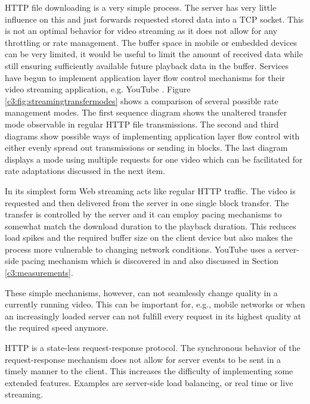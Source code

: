 \gls{HTTP} file downloading is a very simple process. The server has very little influence on this and just forwards requested stored data into a TCP socket. This is not an optimal behavior for video streaming as it does not allow for any throttling or rate management. The buffer space in mobile or embedded devices can be very limited, it would be useful to limit the amount of received data while still ensuring sufficiently available future playback data in the buffer. Services have begun to implement application layer flow control mechanisms for their video streaming application, e.g. YouTube \cite{alcock2011afcyt}. Figure \ref{c3:fig:streamingtransfermodes} shows a comparison of several possible rate management modes. The first sequence diagram shows the unaltered transfer mode observable in regular HTTP file transmissions. The second and third diagrams show possible ways of implementing application layer flow control with either evenly spread out transmissions or sending in blocks. The last diagram displays a mode using multiple requests for one video which can be facilitated for rate adaptations discussed in the next item.


In its simplest form Web streaming acts like regular \gls{HTTP} traffic. The video is requested and then delivered from the server in one single block transfer. The transfer is controlled by the server and it can employ pacing mechanisms to somewhat match the download duration to the playback duration. This reduces load spikes and the required buffer size on the client device but also makes the process more vulnerable to changing network conditions. YouTube uses a server-side pacing mechanism which is  discovered in \cite{alcock2011afcyt} and also discussed in Section \ref{c3:measurements}.

These simple mechanisms, however, can not seamlessly change quality in a currently running video. This can be important for, e.g., mobile networks or when an increasingly loaded server can not fulfill every request in its highest quality at the required speed anymore.


\gls{HTTP} is a state-less request-response protocol. The synchronous behavior of the request-response mechanism does not allow for server events to be sent in a timely manner to the client. This increases the difficulty of implementing some extended features. Examples are server-side load balancing, or real time or live streaming. 


